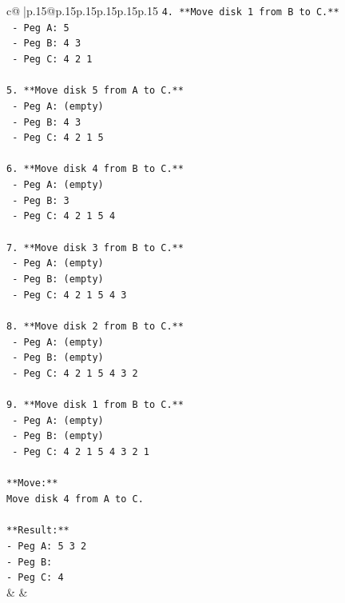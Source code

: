 \documentclass{article}
\begin{document}
{\begin{supertabular}{c@{$\;$}|p{.15\linewidth}@{}p{.15\linewidth}p{.15\linewidth}p{.15\linewidth}p{.15\linewidth}p{.15\linewidth}}
{{{\texttt{4. **Move disk 1 from B to C.**} \\
\texttt{   {-} Peg A: 5} \\
\texttt{   {-} Peg B: 4 3} \\
\texttt{   {-} Peg C: 4 2 1} \\
\\ 
\texttt{5. **Move disk 5 from A to C.**} \\
\texttt{   {-} Peg A: (empty)} \\
\texttt{   {-} Peg B: 4 3} \\
\texttt{   {-} Peg C: 4 2 1 5} \\
\\ 
\texttt{6. **Move disk 4 from B to C.**} \\
\texttt{   {-} Peg A: (empty)} \\
\texttt{   {-} Peg B: 3} \\
\texttt{   {-} Peg C: 4 2 1 5 4} \\
\\ 
\texttt{7. **Move disk 3 from B to C.**} \\
\texttt{   {-} Peg A: (empty)} \\
\texttt{   {-} Peg B: (empty)} \\
\texttt{   {-} Peg C: 4 2 1 5 4 3} \\
\\ 
\texttt{8. **Move disk 2 from B to C.**} \\
\texttt{   {-} Peg A: (empty)} \\
\texttt{   {-} Peg B: (empty)} \\
\texttt{   {-} Peg C: 4 2 1 5 4 3 2} \\
\\ 
\texttt{9. **Move disk 1 from B to C.**} \\
\texttt{   {-} Peg A: (empty)} \\
\texttt{   {-} Peg B: (empty)} \\
\texttt{   {-} Peg C: 4 2 1 5 4 3 2 1} \\
\\ 
\texttt{**Move:**} \\
\texttt{Move disk 4 from A to C.} \\
\\ 
\texttt{**Result:**} \\
\texttt{{-} Peg A: 5 3 2} \\
\texttt{{-} Peg B:} \\
\texttt{{-} Peg C: 4} \\
            }
        }
    }
    & & \\ \\


\end{supertabular}}
\end{document}
